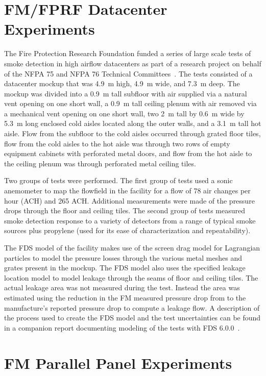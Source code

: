 \section{FM/FPRF Datacenter Experiments}

The Fire Protection Research Foundation funded a series of large scale tests of smoke detection in high airflow datacenters as part of a research project on behalf of the NFPA 75 and NFPA 76 Technical Committees~\cite{FM_Datacenter_Rpt}. The tests consisted of a datacenter mockup that was 4.9~m high, 4.9~m wide, and 7.3~m deep. The mockup was divided into a 0.9~m tall subfloor with air supplied via a natural vent opening on one short wall, a 0.9~m tall ceiling plenum with air removed via a mechanical vent opening on one short wall, two 2~m tall by 0.6~m wide by 5.3~m long enclosed cold aisles located along the outer walls, and a 3.1~m tall hot aisle.  Flow from the subfloor to the cold aisles occurred through grated floor tiles, flow from the cold aisles to the hot aisle was through two rows of empty equipment cabinets with perforated metal doors, and flow from the hot aisle to the ceiling plenum was through perforated metal ceiling tiles.

Two groups of tests were performed. The first group of tests used a sonic anemometer to map the flowfield in the facility for a flow of 78 air changes per hour (ACH) and 265 ACH. Additional measurements were made of the pressure drops through the floor and ceiling tiles. The second group of tests measured smoke detection response to a variety of detectors from a range of typical smoke sources plus propylene (used for its ease of characterization and repeatability).

The FDS model of the facility makes use of the screen drag model for Lagrangian particles to model the pressure losses through the various metal meshes and grates present in the mockup. The FDS model also uses the specified leakage location model to model leakage through the seams of floor and ceiling tiles. The actual leakage area was not measured during the test. Instead the area was estimated using the reduction in the FM measured pressure drop from to the manufacture's reported pressure drop to compute a leakage flow. A description of the process used to create the FDS model and the test uncertainties can be found in a companion report documenting modeling of the tests with FDS 6.0.0~\cite{FDS_Datacenter_Rpt}.


\section{FM Parallel Panel Experiments}

